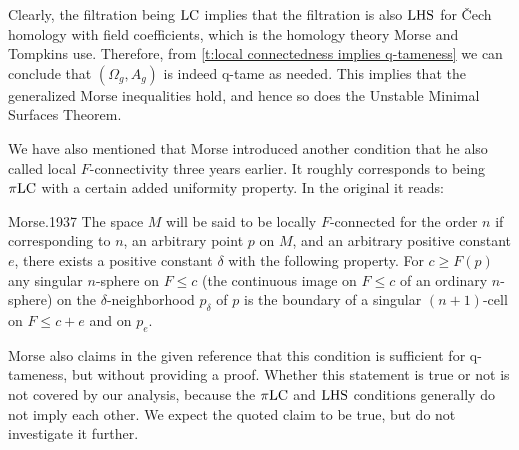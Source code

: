 Clearly, the filtration being $\mathrm{LC}$ implies that the filtration is also $\mathrm{LHS}$ for \v{C}ech homology with field coefficients, which is the homology theory Morse and Tompkins use.
Therefore, from \cref{t:local connectedness implies q-tameness} we can conclude that $(\Omega_g, A_g)$ is indeed \mbox{q-tame} as needed.
This implies that the generalized Morse inequalities hold, and hence so does the Unstable Minimal Surfaces Theorem.

We have also mentioned that Morse introduced another condition that he also called local $F$-connectivity three years earlier.
It roughly corresponds to being $\pi\mathrm{LC}$ with a certain added uniformity property.
In the original it reads:
\begin{displaycquote}[p.421--422]{Morse.1937}
	The space $M$ will be said to be locally $F$-connected for the order $n$ if corresponding to $n$, an arbitrary point $p$ on $M$, and an arbitrary positive constant $e$, there exists a positive constant $\delta$ with the following property.
	For $c \geq F(p)$ any singular $n$-sphere on $F \leq c$ (the continuous image on $F \leq c$ of an ordinary $n$-sphere) on the $\delta$-neighborhood $p_{\delta}$ of $p$ is the boundary of a singular $(n + 1)$-cell on $F \leq c + e$ and on $p_e$.
\end{displaycquote}
Morse also claims in the given reference that this condition is sufficient for q-tameness, but without providing a proof.
Whether this statement is true or not is not covered by our analysis, because the $\pi\mathrm{LC}$ and $\mathrm{LHS}$ conditions generally do not imply each other.
We expect the quoted claim to be true, but do not investigate it further.
